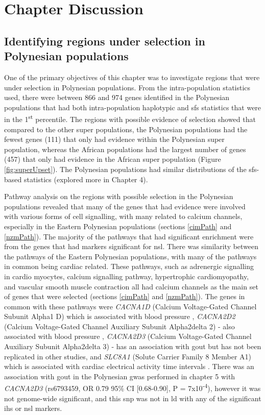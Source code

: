 \documentclass[twoside,openright]{report}
\begin{document}
\section{Chapter Discussion}\label{selectionDissussion}

\subsection{Identifying regions under selection in Polynesian
populations}\label{identifying-regions-under-selection-in-polynesian-populations}

One of the primary objectives of this chapter was to investigate regions
that were under selection in Polynesian populations. From the
intra-population statistics used, there were between 866 and 974 genes
identified in the Polynesian populations that had both intra-population
haplotypic and \gls{sfs} statistics that were in the
1\textsuperscript{st} percentile. The regions with possible evidence of
selection showed that compared to the other super populations, the
Polynesian populations had the fewest genes (111) that only had evidence
within the Polynesian super population, whereas the African populations
had the largest number of genes (457) that only had evidence in the
African super population (Figure \ref{fig:superUpset}). The Polynesian
populations had similar distributions of the \gls{sfs}-based statistics
(explored more in Chapter 4).

Pathway analysis on the regions with possible selection in the
Polynesian populations revealed that many of the genes that had evidence
were involved with various forms of cell signalling, with many related
to calcium channels, especially in the Eastern Polynesian populations
(sections \ref{cimPath} and \ref{nzmPath}). The majority of the pathways
that had significant enrichment were from the genes that had markers
significant for \gls{nsl}. There was similarity between the pathways of
the Eastern Polynesian populations, with many of the pathways in common
being cardiac related. These pathways, such as adrenergic signalling in
cardio myocytes, calcium signalling pathway, hypertrophic
cardiomyopathy, and vascular smooth muscle contraction all had calcium
channels as the main set of genes that were selected (sections
\ref{cimPath} and \ref{nzmPath}). The genes in common with these
pathways were \emph{CACNA1D} (Calcium Voltage-Gated Channel Subunit
Alpha1 D) which is associated with blood pressure \citep{Lu2015},
\emph{CACNA2D2} (Calcium Voltage-Gated Channel Auxiliary Subunit
Alpha2delta 2) - also associated with blood pressure \citep{Warren2017},
\emph{CACNA2D3} (Calcium Voltage-Gated Channel Auxiliary Subunit
Alpha2delta 3) - has an association with gout \citep{Lai2012} but has
not been replicated in other studies, and \emph{SLC8A1} (Solute Carrier
Family 8 Member A1) which is associated with cardiac electrical activity
time intervals \citep{Arking2014}. There was an association with gout in
the Polynesian \gls{gwas} performed in chapter 5 with \emph{CACNA2D3}
(rs6793459, OR 0.79 95\% CI {[}0.68-0.90{]}, P =
7x10\textsuperscript{-4}), however it was not genome-wide significant,
and this \gls{snp} was not in \gls{ld} with any of the significant
\gls{ihs} or \gls{nsl} markers.
\end{document}
